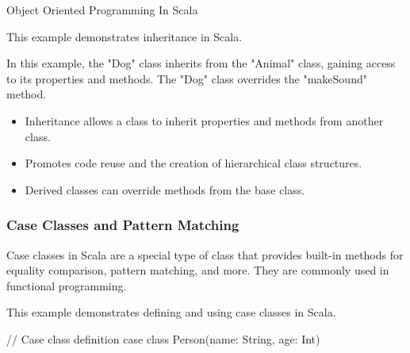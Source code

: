 \begin{notes}{Object Oriented Programming In Scala}
    \begin{highlight}
    
        This example demonstrates inheritance in Scala.
    
    
        In this example, the "Dog" class inherits from the "Animal" class, gaining access to its properties and methods. The "Dog" class overrides the "makeSound" method.
    
        \begin{itemize}
            \item Inheritance allows a class to inherit properties and methods from another class.
            \item Promotes code reuse and the creation of hierarchical class structures.
            \item Derived classes can override methods from the base class.
        \end{itemize}
    
    \end{highlight}
    
    \subsubsection*{Case Classes and Pattern Matching}
    
    Case classes in Scala are a special type of class that provides built-in methods for equality comparison, pattern matching, and more. They are commonly used in functional programming.
    
    \begin{highlight}
    
        This example demonstrates defining and using case classes in Scala.
    
    \begin{code}[Scala]
    // Case class definition
    case class Person(name: String, age: Int)
    

\end{code}
\end{highlight}
\end{notes}
